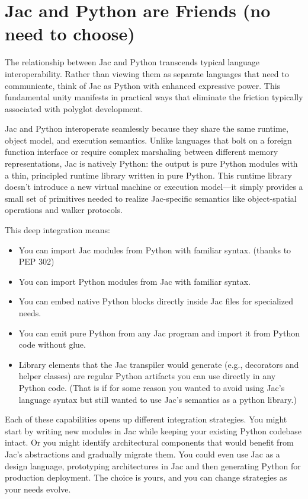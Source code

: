 \section{Jac and Python are Friends (no need to choose)}

The relationship between Jac and Python transcends typical language interoperability. Rather than viewing them as separate languages that need to communicate, think of Jac as Python with enhanced expressive power. This fundamental unity manifests in practical ways that eliminate the friction typically associated with polyglot development.

Jac and Python interoperate seamlessly because they share the same runtime, object model, and execution semantics. Unlike languages that bolt on a foreign function interface or require complex marshaling between different memory representations, Jac is natively Python: the output is pure Python modules with a thin, principled runtime library written in pure Python. This runtime library doesn't introduce a new virtual machine or execution model—it simply provides a small set of primitives needed to realize Jac-specific semantics like object-spatial operations and walker protocols.

This deep integration means:

\begin{itemize}
    \item You can import Jac modules from Python with familiar syntax. (thanks to PEP 302)
    \item You can import Python modules from Jac with familiar syntax.
    \item You can embed native Python blocks directly inside Jac files for specialized needs.
    \item You can emit pure Python from any Jac program and import it from Python code without glue.
    \item Library elements that the Jac transpiler would generate (e.g., decorators and helper classes) are regular Python artifacts you can use directly in any Python code. (That is if for some reason you wanted to avoid using Jac's language syntax but still wanted to use Jac's semantics as a python library.)
\end{itemize}

Each of these capabilities opens up different integration strategies. You might start by writing new modules in Jac while keeping your existing Python codebase intact. Or you might identify architectural components that would benefit from Jac's abstractions and gradually migrate them. You could even use Jac as a design language, prototyping architectures in Jac and then generating Python for production deployment. The choice is yours, and you can change strategies as your needs evolve.

